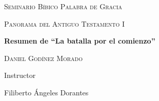 

%

\begin{titlepage}
	\begin{center}
		\vspace*{1cm}
		{\scshape\LARGE Seminario Bíbico Palabra de Gracia \par}
		\vspace{1cm}
		{\scshape\LARGE Panorama del Antiguo Testamento I \par}
		\vspace{1.5cm}
		{\huge\bfseries Resumen de ``La batalla por el comienzo'' \par}
		\vspace{2cm}
		{\Large\scshape Daniel Godínez Morado \par}
		\vfill
		Instructor\par
		Filiberto Ángeles Dorantes
		\vfill

		{\large {}}
	\end{center}

\end{titlepage}
%
